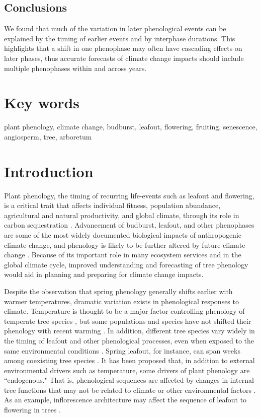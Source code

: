 \documentclass{article}
\begin{document}
\subsection*{Conclusions}
We found that much of the variation in later phenological events can be explained by the timing of earlier events and by interphase durations. This highlights that a shift in one phenophase may often have cascading effects on later phases, thus accurate forecasts of climate change impacts should include multiple phenophases within and across years. 

\section* {Key words}
plant phenology, climate change, budburst, leafout, flowering, fruiting, senescence, angiosperm, tree, arboretum
\section* {Introduction}
Plant phenology, the timing of recurring life-events such as leafout and flowering, is a critical trait that affects individual fitness, population abundance, agricultural and natural productivity, and global climate, through its role in carbon sequestration \citep{chuine2001,cleland2007,willis2010,miller-rushing2010,craine2012}. Advancement of budburst, leafout, and other phenophases are some of the most widely documented biological impacts of anthropogenic climate change, and phenology is likely to be further altered by future climate change \citep{parmesan2006}. Because of its important role in many ecosystem services and in the global climate cycle, improved understanding and forecasting of tree phenology would aid in planning and preparing for climate change impacts.

\par Despite the observation that spring phenology generally shifts earlier with warmer temperatures, dramatic variation exists in phenological responses to climate. Temperature is thought to be a major factor controlling phenology of temperate tree species \citep{parmesan2006,richardson2006,morin2010,schwartz2013,clark2014b}, but some populations and species have not shifted their phenology with recent warming \citep{wolkovich2012}. In addition, different tree species vary widely in the timing of leafout and other phenological processes, even when exposed to the same environmental conditions \citep{lechowicz1984,primack2009c}. Spring leafout, for instance, can span weeks among coexisting tree species \citep{lechowicz1984}. It has been proposed that, in addition to external environmental drivers such as temperature, some drivers of plant phenology are ``endogenous." That is, phenological sequences are affected by changes in internal tree functions that may not be related to climate or other environmental factors \citep{borchert1992,marco2002}. As an example, inflorescence architecture may affect the sequence of leafout to flowering in trees \citep{marco2002}. 
\end{document}

